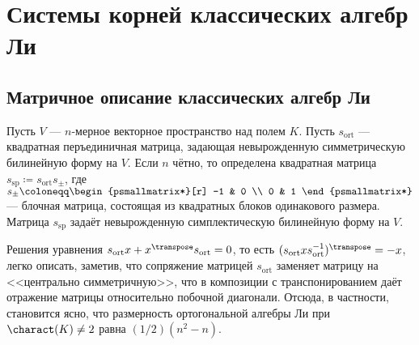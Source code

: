 \documentclass[
	extrafontsizes,
	11pt,
	hyphens,
]{memoir}
\begin{document}
\section{Системы корней классических алгебр Ли}

%

\subsection{Матричное описание классических алгебр Ли}

Пусть \(V\) --- \(n\)-мерное векторное пространство над полем \(K\).
Пусть \(s_{\mathrm{ort}}\) --- квадратная перъединичная матрица, задающая невырожденную симметрическую билинейную форму на \(V\).
Если \(n\) чётно, то определена квадратная матрица \(s_{\mathrm{sp}} \coloneqq s_{\mathrm{ort}} s_{\pm}\), где
\(
s_{\pm}
\coloneqq
\begin{psmallmatrix*}[r]
    -1 & 0 \\
    0 & 1
\end{psmallmatrix*}
\)
--- блочная матрица, состоящая из квадратных блоков одинакового размера. Матрица \(s_{\mathrm{sp}}\) задаёт невырожденную симплектическую билинейную форму на \(V\).

Решения уравнения
\(s_{\mathrm{ort}} x + x^{\transpose} s_{\mathrm{ort}} = 0\),
то есть
\((s_{\mathrm{ort}} x s_{\mathrm{ort}}^{-1})^{\transpose} = -x\),
легко описать, заметив, что
сопряжение матрицей \(s_{\mathrm{ort}}\) заменяет матрицу на <<центрально симметричную>>, что в композиции с транспонированием даёт отражение матрицы относительно побочной диагонали.
Отсюда, в частности, становится ясно, что размерность ортогональной алгебры Ли при \(\charact(K) \neq 2\) равна \((1/2)(n^2 - n)\).
\end{document}
